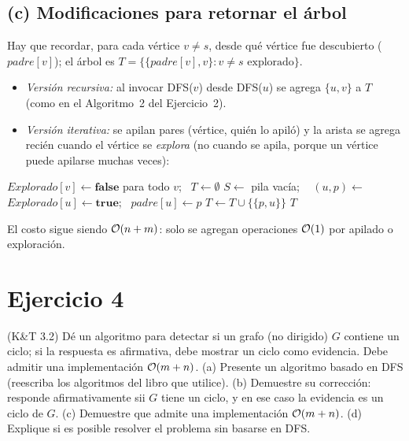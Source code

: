 \subsection*{(c) Modificaciones para retornar el árbol}
Hay que recordar, para cada vértice $v\neq s$, desde qué vértice fue descubierto ($padre[v]$); el
árbol es $T=\{\{padre[v],v\}: v\neq s \text{ explorado}\}$.
\begin{itemize}
  \item \emph{Versión recursiva:} al invocar \textsc{DFS}($v$) desde \textsc{DFS}($u$) se agrega
  $\{u,v\}$ a $T$ (como en el Algoritmo~2 del Ejercicio~2).
  \item \emph{Versión iterativa:} se apilan pares (vértice, quién lo apiló) y la arista se agrega
  recién cuando el vértice se \emph{explora} (no cuando se apila, porque un vértice puede apilarse
  muchas veces):
\end{itemize}
\begin{algorithm}[H]
\caption{DFS iterativo que retorna el árbol}
\begin{algorithmic}[1]
  \State $Explorado[v]\gets\textbf{false}$ para todo $v$; \ $T\gets\emptyset$
  \State $S\gets$ pila vacía; \ 
    \State $(u,p)\gets$ 
      \State $Explorado[u]\gets\textbf{true}$; \ $padre[u]\gets p$
       $T\gets T\cup\{\{p,u\}\}$ \EndIf
          \EndIf
      \EndFor
    \EndIf
  \EndWhile
  \State \Return $T$
\EndFunction
\end{algorithmic}
\end{algorithm}
El costo sigue siendo $\mathcal{O}(n+m)$: solo se agregan operaciones $\mathcal{O}(1)$ por apilado o exploración.

\section{Ejercicio 4}
\begin{enunciado}
(K\&T 3.2) Dé un algoritmo para detectar si un grafo (no dirigido) $G$ contiene un ciclo; si la
respuesta es afirmativa, debe mostrar un ciclo como evidencia. Debe admitir una implementación
$\mathcal{O}(m+n)$.
(a) Presente un algoritmo basado en DFS (reescriba los algoritmos del libro que utilice).
(b) Demuestre su corrección: responde afirmativamente sii $G$ tiene un ciclo, y en ese caso la
evidencia es un ciclo de $G$.
(c) Demuestre que admite una implementación $\mathcal{O}(m+n)$.
(d) Explique si es posible resolver el problema sin basarse en DFS.
\end{enunciado}


